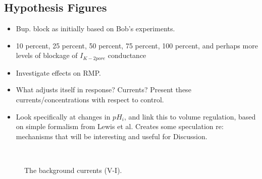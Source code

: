 \subsection{Hypothesis Figures}
\begin{itemize}
\item Bup. block as initially based on Bob's experiments.
\item 10 percent, 25 percent, 50 percent, 75 percent, 100 percent, and
  perhaps more levels of blockage of $I_{K-2pore}$ conductance
\item Investigate effects on RMP.
\item What adjusts itself in response? Currents? Present these
    currents/concentrations with respect to control.
\item Look specifically at changes in $pH_i$, and link this to volume
  regulation, based on simple formalism from Lewis et al. Creates some
  speculation re: mechanisms that will be interesting and useful for
  Discussion.
\end{itemize}

\begin{figure}
  \centering
  \\
  \subfloat{\hspace{0.425\textwidth}}
  \caption{The background currents (V-I).}
  \label{fig:background-currents-vi}
\end{figure}




